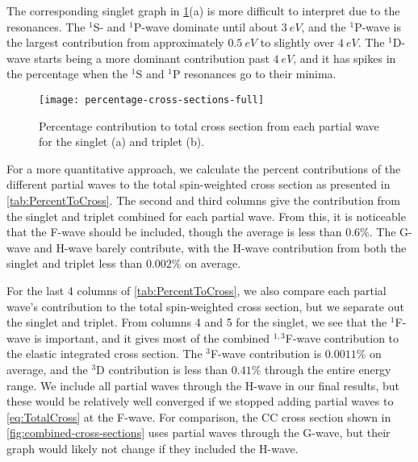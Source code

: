 \documentclass[Dissertation.tex]{subfiles}
\begin{document}
The corresponding singlet graph in \cref{fig:percentage-cross-sections-full}(a)
is more difficult to interpret due to the resonances. The $^1$S- and
$^1$P-wave dominate until about $\SI{3}{eV}$, and the $^1$P-wave is the largest 
contribution from approximately $\SI{0.5}{eV}$ to slightly over $\SI{4}{eV}$.
The $^1$D-wave starts being a more dominant contribution past $\SI{4}{eV}$, and
it has spikes in the percentage when the $^1$S and $^1$P resonances go to their
minima.

\begin{figure}
	\centering
	\texttt{[image: percentage-cross-sections-full]}
	\caption[Percentage contribution to total cross section]{Percentage contribution to total cross section from each partial wave for the singlet (a) and triplet (b).}
	\label{fig:percentage-cross-sections-full}
\end{figure}

For a more quantitative approach, we calculate the percent contributions of the
different partial waves to the total spin-weighted cross section as presented
in \cref{tab:PercentToCross}. The second and third columns give the
contribution from the singlet and triplet combined for each partial wave. From
this, it is noticeable that the F-wave should be included, though the average
is less than $0.6\%$. The G-wave and H-wave barely contribute, with the H-wave
contribution from both the singlet and triplet less than $0.002\%$ on 
average.

For the last 4 columns of \cref{tab:PercentToCross}, we also compare each
partial wave's contribution to the total spin-weighted cross section, but we
separate out the singlet and triplet. From columns 4 and 5 for the singlet,
we see that the $^1$F-wave is important, and it gives most of the combined
$^{1,3}$F-wave contribution to the elastic integrated cross section. The 
$^3$F-wave contribution is $0.0011\%$ on average, and the $^3$D contribution 
is less than $0.41\%$ through the entire energy range. We include all partial
waves through the H-wave in our final results, but these would be relatively
well converged if we stopped adding partial waves to \cref{eq:TotalCross} at
the F-wave. For comparison, the CC \cite{Walters2004} cross section shown in
\cref{fig:combined-cross-sections} uses partial waves through the G-wave, but
their graph would likely not change if they included the H-wave.
\end{document}
